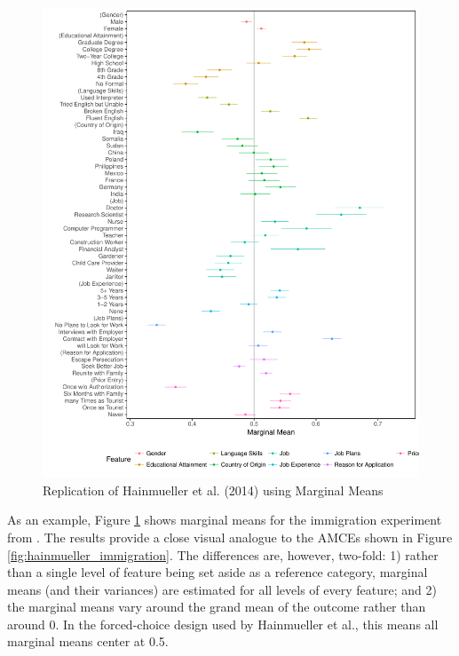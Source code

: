 \documentclass[a4paper,12pt]{article}\usepackage[]{graphicx}\usepackage[]{color}
\makeatletter
\def\maxwidth{ %
  \ifdim\Gin@nat@width>\linewidth
    \linewidth
  \else
    \Gin@nat@width
  \fi
}
\newenvironment{kframe}{%
 \def\at@end@of@kframe{}%
 \ifinner\ifhmode%
  \def\at@end@of@kframe{\end{minipage}}%
  \begin{minipage}{\columnwidth}%
 \fi\fi%
 \def\FrameCommand##1{\hskip\@totalleftmargin \hskip-\fboxsep
 \colorbox{shadecolor}{##1}\hskip-\fboxsep
     \hskip-\linewidth \hskip-\@totalleftmargin \hskip\columnwidth}%
 \MakeFramed {\advance\hsize-\width
   \@totalleftmargin\z@ \linewidth\hsize
   \@setminipage}}%
 {\par\unskip\endMakeFramed%
 \at@end@of@kframe}
\newenvironment{knitrout}{}{} %
\makeatother
\begin{document}
\begin{knitrout}
\color{fgcolor}\begin{kframe}


{\ttfamily\noindent\itshape\color{messagecolor}{\#\# Loading required namespace: ggstance}}\end{kframe}\begin{figure}
\includegraphics[width=\maxwidth]{figure/hainmueller_immigration_mm-1} \caption[Replication of Hainmueller et al]{Replication of Hainmueller et al. (2014) using Marginal Means}\label{fig:hainmueller_immigration_mm}
\end{figure}


\end{knitrout}

As an example, Figure \ref{fig:hainmueller_immigration_mm} shows marginal means for the immigration experiment from \citet{HainmuellerHopkinsYamamoto2014}. The results provide a close visual analogue to the AMCEs shown in Figure \ref{fig:hainmueller_immigration}. The differences are, however, two-fold: 1) rather than a single level of feature being set aside as a reference category, marginal means (and their variances) are estimated for all levels of every feature; and 2) the marginal means vary around the grand mean of the outcome rather than around 0. In the forced-choice design used by Hainmueller et al., this means all marginal means center at 0.5.
\end{document}
